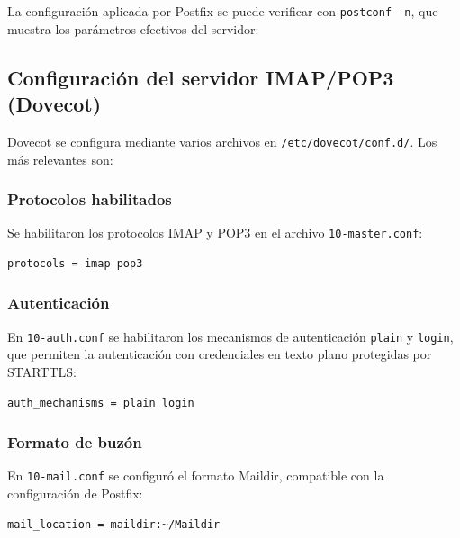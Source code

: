 La configuración aplicada por Postfix se puede verificar con
\texttt{postconf -n}, que muestra los parámetros efectivos del servidor:


\subsection{Configuración del servidor IMAP/POP3 (Dovecot)}

Dovecot se configura mediante varios archivos en \texttt{/etc/dovecot/conf.d/}.
Los más relevantes son:

\subsubsection{Protocolos habilitados}

Se habilitaron los protocolos IMAP y POP3 en el archivo
\texttt{10-master.conf}:

\begin{lstlisting}[style=terminal]
protocols = imap pop3
\end{lstlisting}

\subsubsection{Autenticación}

En \texttt{10-auth.conf} se habilitaron los mecanismos de autenticación
\texttt{plain} y \texttt{login}, que permiten la autenticación con
credenciales en texto plano protegidas por STARTTLS:

\begin{lstlisting}[style=terminal]
auth_mechanisms = plain login
\end{lstlisting}

\subsubsection{Formato de buzón}

En \texttt{10-mail.conf} se configuró el formato Maildir, compatible con
la configuración de Postfix:

\begin{lstlisting}[style=terminal]
mail_location = maildir:~/Maildir
\end{lstlisting}

